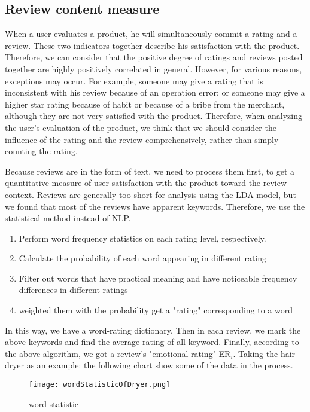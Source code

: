 \documentclass{mcmthesis}
\begin{document}
\subsection{Review content measure}
When a user evaluates a product, he will simultaneously commit a rating and a review. These two indicators together describe his satisfaction with the product. Therefore, we can consider that the positive degree of ratings and reviews posted together are highly positively correlated in general. However, for various reasons, exceptions may occur. For example, someone may give a rating that is inconsistent with his review because of an operation error; or someone may give a higher star rating because of habit or because of a bribe from the merchant, although they are not very satisfied with the product. Therefore, when analyzing the user's evaluation of the product, we think that we should consider the influence of the rating and the review comprehensively, rather than simply counting the rating.

Because reviews are in the form of text, we need to process them first, to get a quantitative measure of user satisfaction with the product toward the review context. Reviews are generally too short for analysis using the LDA model, but we found that most of the reviews have apparent keywords. Therefore, we use the statistical method instead of NLP.

\begin{enumerate}
\item Perform word frequency statistics on each rating level, respectively.
\item Calculate the probability of each word appearing in different rating
\item Filter out words that have practical meaning and have noticeable frequency differences in different ratings
\item weighted them with the probability get a "rating" corresponding to a word
\end{enumerate}

In this way, we have a word-rating dictionary. Then in each review, we mark the above keywords and find the average rating of all keyword. Finally, according to the above algorithm, we got a review's "emotional rating" ER$_{i}$.
Taking the hair-dryer as an example: the following chart show some of the data in the process.

\begin{figure}[h]
  \small
  \centering
  \texttt{[image: wordStatisticOfDryer.png]}
  \caption{word statistic} \label{fig:aa}
\end{figure}
\end{document}

